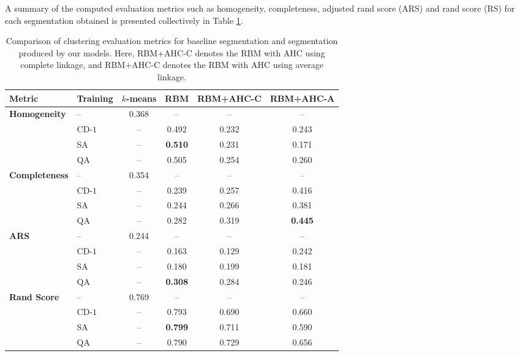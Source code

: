 \documentclass[a4paper,12pt]{article}
\begin{document}
\noindent A summary of the computed evaluation metrics such as homogeneity, completeness, adjusted rand score (ARS) and rand score (RS) for each segmentation obtained is presented collectively in Table \ref{tab:segmentation_metrics_comparison}.

\begin{table}
    \centering
    \caption[Comparison of clustering evaluation metrics for baseline segmentation and segmentation produced by our models.]{Comparison of clustering evaluation metrics for baseline segmentation and segmentation produced by our models. Here, RBM+AHC-C denotes the RBM with AHC using complete linkage, and RBM+AHC-C denotes the RBM with AHC using average linkage.}
    \begin{tabular}{@{} llcccc @{}}
        \toprule
        \textbf{Metric} & \textbf{Training} & \textbf{$k$-means} & \textbf{RBM} & \textbf{RBM+AHC-C} & \textbf{RBM+AHC-A} \\
        \midrule
        \textbf{Homogeneity} & -- & 0.368 & -- & -- & -- \\
                             & CD-$1$ & -- & 0.492 & 0.232 & 0.243 \\
                             & SA  & -- & \textbf{0.510} & 0.231 & 0.171 \\
                             & QA  & -- & 0.505 & 0.254 & 0.260 \\
        \midrule
        \textbf{Completeness} & -- & 0.354 & -- & -- & -- \\
                              & CD-$1$ & -- & 0.239 & 0.257 & 0.416 \\
                              & SA  & -- & 0.244 & 0.266 & 0.381 \\
                              & QA  & -- & 0.282 & 0.319 & \textbf{0.445} \\
        \midrule
        \textbf{ARS} & -- & 0.244 & -- & -- & -- \\
                     & CD-$1$ & -- & 0.163 & 0.129 & 0.242 \\
                     & SA  & -- & 0.180 & 0.199 & 0.181 \\
                     & QA  & -- & \textbf{0.308} & 0.284 & 0.246 \\
        \midrule
        \textbf{Rand Score} & -- & 0.769 & -- & -- & -- \\
                            & CD-$1$ & -- & 0.793 & 0.690 & 0.660 \\
                            & SA  & -- & \textbf{0.799} & 0.711 & 0.590 \\
                            & QA  & -- & 0.790 & 0.729 & 0.656 \\
        \bottomrule
    \end{tabular}
    \label{tab:segmentation_metrics_comparison}
\end{table}
\end{document}

